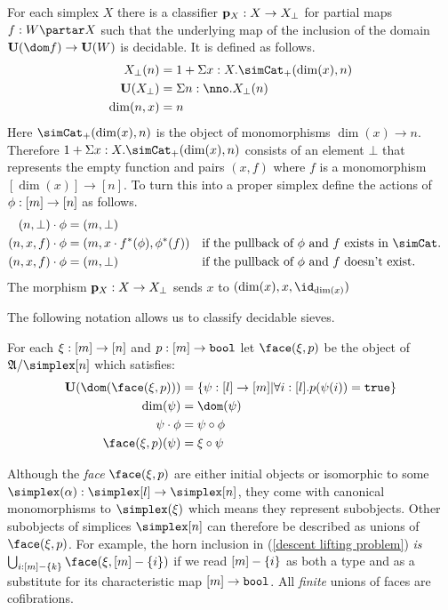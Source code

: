 \documentclass[csh.tex]{subfiles}
\begin{document}
\begin{definition} 
For each simplex $X$ there is a classifier $\mathbf p_X: X\to X_\bot$ for partial maps $f\of W\partar X$ such that the underlying map of the inclusion of the domain $\base(\dom f)\to \base(W)$ is decidable. It is defined as follows.
\begin{align*}
X_\bot(n) &= 1+\Sigma x\of X.\simCat_+(\dim(x),n)\\
\base(X_\bot) &= \Sigma n\of \nno.X_\bot(n)\\
\dim(n,x) &= n\\
\end{align*}
\newcommand\empt\bot
Here $\simCat_+(\dim(x),n)$ is the object of monomorphisms $\dim(x)\to n$. Therefore $1+\Sigma x\of X.\simCat_+(\dim(x),n)$ consists of an element $\empt$ that represents the empty function and pairs $(x,f)$ where $f$ is a monomorphism $[\dim(x)]\to [n]$. To turn this into a proper simplex define the actions of $\phi:[m]\to[n]$ as follows.
\begin{align*}
(n,\empt)\cdot\phi &= (m,\empt) \\
(n,x,f)\cdot\phi &= (m,x\cdot f\ri(\phi),\phi\ri(f))&&\textrm{if the pullback of $\phi$ and $f$ exists in $\simCat$.}\\
(n,x,f)\cdot\phi &= (m,\empt)&&\textrm{if the pullback of $\phi$ and $f$ doesn't exist.}
\end{align*}
The morphism $\mathbf p_X: X\to X_\bot$ sends $x$ to $(\dim(x),x,\id_{\dim(x)})$
\end{definition}


The following notation allows us to classify decidable sieves.

\begin{definition} For each $\xi:[m]\to[n]$ and $p:[m]\to\mathtt{bool}$ let $\face(\xi,p)$ be the object of $\ambient/\simplex[n]$ which satisfies: 
\begin{align*}
\base(\dom(\face(\xi,p))) &= \set{\psi\of[l]\to[m]| \forall i\of[l].p(\psi(i))=\true}\\
\dim(\psi) &= \dom(\psi) \\
\psi\cdot\phi &= \psi\circ\phi\\
\face(\xi,p)(\psi) &= \xi\circ\psi
\end{align*}
\end{definition}

Although the \emph{face} $\face(\xi,p)$ are either initial objects or isomorphic to some $\simplex(\alpha)\of\simplex[l]\to\simplex[n]$, they come with canonical monomorphisms to $\simplex(\xi)$ which means they represent subobjects. Other subobjects of simplices $\simplex[n]$ can therefore be described as unions of $\face(\xi,p)$. For example, the horn inclusion in (\ref{descent lifting problem}) \emph{is} $\bigcup_{i\of [m]-\set k} \face(\xi,[m]-\set i)$ if we read $[m]-\left\{i\right\}$ as both a type and as a substitute for its characteristic map $[m]\to\mathtt{bool}$. All \emph{finite} unions of faces are cofibrations.
\end{document}
